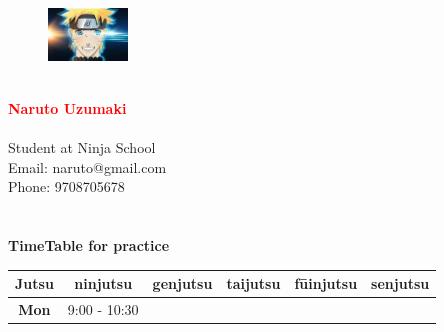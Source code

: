 \documentclass[a4paper,12pt]{article}
\begin{document}
\pagestyle{empty}\\
\begin{figure}
\includegraphics[width=80px]{download.jpeg}
\end{figure}\\
\textcolor{red}{\textbf{\LARGE{Naruto Uzumaki }}}\\\\
Student at Ninja School \\
Email: naruto@gmail.com\\
Phone: 9708705678\\\\\\
\caption{\large{\textbf{TimeTable for practice}}}
\centering \begin{table}[h]
   \centering \begin{tabular}{|C|C|C|C|C|C|}
        \hline
        \textbf{Jutsu} & ninjutsu & genjutsu  & taijutsu &  fūinjutsu & senjutsu\\
        \hline
        \textbf{Mon}& 9:00 - 10:30 & & & &

    \end{tabular}
\end{table}
\end{document}
